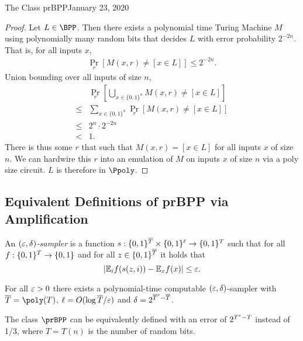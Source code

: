 \begin{lecture}{1}{The Class prBPP}{January 23, 2020}
\begin{proof}
    Let $L \in \BPP$.
    Then there exists a polynomial time Turing Machine $M$ using polynomially many random bits that decides $L$ with error probability $2^{-2n}$.
    That is, for all inputs $x$,
    \begin{align*}
        \Pr_r\left[M(x,r) \neq [x \in L]\right] \leq 2^{-2n}.
    \end{align*}
    Union bounding over all inputs of size $n$,
    \begin{align*}
                & \Pr_r\left[\bigcup_{x \in \{0,1\}^n} M(x,r) \neq [x \in L]\right]
        \\ \leq & \sum_{x \in \{0,1\}^n} \Pr_r\left[M(x,r) \neq [x \in L]\right]
        \\ \leq & 2^n \cdot 2^{-2n}
        \\ <    & 1.
    \end{align*}
    There is thus some $r$ that such that $M(x,r) = \left[x \in L\right]$ for all inputs $x$ of size $n$.
    We can hardwire this $r$ into an emulation of $M$ on inputs $x$ of size $n$ via a poly size circuit.
    $L$ is therefore in $\Ppoly$.
\end{proof}

\subsection{Equivalent Definitions of prBPP via Amplification}


\begin{definition}
  An \emph{$(\varepsilon, \delta)$-sampler} is a function $s :
  \{0,1\}^{\overline{T}} \times \{0,1\}^\ell \to \{0,1\}^T$ such that for
  all $f : \{0,1\}^T \to \{0,1\}$ and for all $z \in
  \{0,1\}^{\overline{T}}$ it holds that \[
    |\mathbb{E}_i f(s(z, i)) - \mathbb{E}_x f(x)| \le \varepsilon.
  \]
\end{definition}

\begin{theorem}
  For all $\varepsilon > 0$ there exists a polynomial-time computable $(\varepsilon,
  \delta)$-sampler with $\overline{T} = \poly(T)$, $\ell = O(\log
  \overline{T}/\varepsilon)$ and $\delta = 2^{\overline{T}^\varepsilon - \overline{T}}$.
\end{theorem}

\begin{corollary}
  The class $\prBPP$ can be equivalently defined with an error of $2^{T^\varepsilon -
  T}$ instead of 1/3, where $T = T(n)$ is the number of random bits.
\end{corollary}


\end{lecture}
